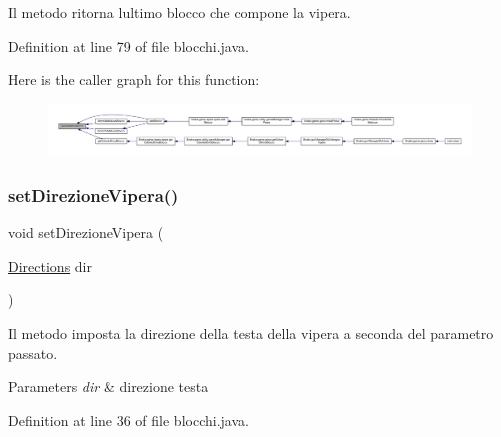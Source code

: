 Il metodo ritorna l\textquotesingle{}ultimo blocco che compone la vipera. 



Definition at line 79 of file blocchi.\+java.

Here is the caller graph for this function\+:
\nopagebreak
\begin{figure}[H]
\begin{center}
\leavevmode
\includegraphics[width=350pt]{class_snake_1_1game_1_1vipera_1_1blocchi_a31739bbc3222c3434ef9b45756523574_icgraph}
\end{center}
\end{figure}
\mbox{\label{class_snake_1_1game_1_1vipera_1_1blocchi_a6007259ace9d33bd56b9a6193e86df39}} 
\subsubsection{\texorpdfstring{set\+Direzione\+Vipera()}{setDirezioneVipera()}}
{\footnotesize\ttfamily void set\+Direzione\+Vipera (\begin{DoxyParamCaption}\item[{\mbox{\hyperlink{enum_snake_1_1game_1_1utility_1_1_directions}{Directions}}}]{dir }\end{DoxyParamCaption})}



Il metodo imposta la direzione della testa della vipera a seconda del parametro passato. 


\begin{DoxyParams}{Parameters}
{\em dir} & direzione testa \\
\hline
\end{DoxyParams}


Definition at line 36 of file blocchi.\+java.

